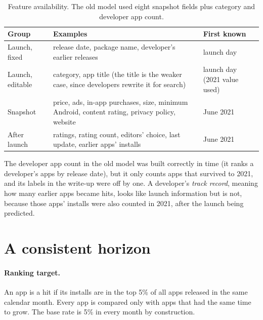 \documentclass[11pt]{article}
\begin{document}
\begin{table}[h]
\centering\small
\begin{tabular}{lp{7.2cm}l}
\toprule
Group & Examples & First known \\
\midrule
Launch, fixed & release date, package name, developer's earlier releases & launch day \\
Launch, editable & category, app title (the title is the weaker case, since developers rewrite it for search) & launch day (2021 value used) \\
Snapshot & price, ads, in-app purchases, size, minimum Android, content rating, privacy policy, website & June 2021 \\
After launch & ratings, rating count, editors' choice, last update, earlier apps' installs & June 2021 \\
\bottomrule
\end{tabular}
\caption{Feature availability. The old model used eight snapshot fields plus category and developer app count.}
\label{tab:avail}
\end{table}

The developer app count in the old model was built correctly in time (it ranks a developer's apps by release date),
but it only counts apps that survived to 2021, and its labels in the write-up were off by one. A developer's
\emph{track record}, meaning how many earlier apps became hits, looks like launch information but is not, because those apps'
installs were also counted in 2021, after the launch being predicted.

\section{A consistent horizon}

\paragraph{Ranking target.} An app is a hit if its installs are in the top 5\% of all apps released in the same
calendar month. Every app is compared only with apps that had the same time to grow. The base rate is 5\% in every
month by construction.
\end{document}
